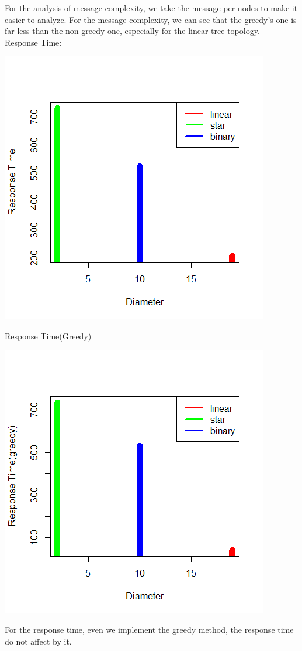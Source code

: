 \documentclass{article}
\begin{document}
For the analysis of message complexity, we take the message per nodes to make it easier to analyze.
For the message complexity, we can see that the greedy’s one is far less than the non-greedy one, especially for the linear tree topology.\\

Response Time:

\begin{center}
    \includegraphics[width=.6\textwidth]{figs/s3} \\
\end{center}

\pagebreak
Response Time(Greedy)

\begin{center}
    \includegraphics[width=.6\textwidth]{figs/s4} \\
\end{center}

For the response time, even we implement the greedy method, the response time do not affect by it. \\
\end{document}
